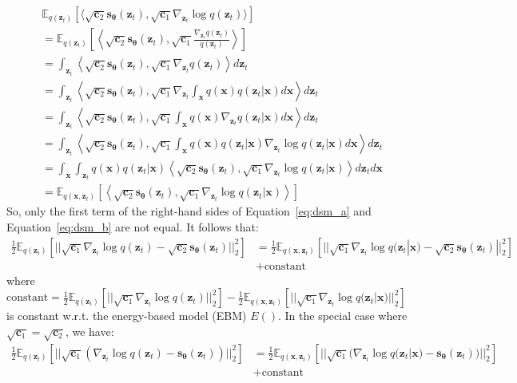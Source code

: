 \documentclass{article}
\def\Eqref#1{Equation~\ref{#1}}
\def\rvc{{\mathbf{c}}}
\def\rvx{{\mathbf{x}}}
\def\rvz{{\mathbf{z}}}
\newcommand{\E}{\mathbb{E}}
\newcommand{\bT}{{\boldsymbol{\theta}}}
\newcommand{\snT}{\mathbf{s}_{\bT}}
\begin{document}
\begin{align}
&\E_{q(\rvz_t)} \left[ \langle \sqrt{\rvc_2}\snT(\rvz_t), \sqrt{\rvc_1}\nabla_{\rvz_t} \log q(\rvz_t) \rangle \right]\\
&= 
\E_{q(\rvz_t)} \left[ \left\langle \sqrt{\rvc_2} \snT(\rvz_t), \sqrt{\rvc_1} \frac{\nabla_{\rvz_t} q(\rvz_t)}{q(\rvz_t)} \right\rangle \right]\\
&= \int_{\rvz_t} \left\langle \sqrt{\rvc_2}\snT(\rvz_t), \sqrt{\rvc_1}\nabla_{\rvz_t} q(\rvz_t) \right\rangle d\rvz_t\\
&= \int_{\rvz_t} \left\langle \sqrt{\rvc_2}\snT(\rvz_t), \sqrt{\rvc_1}\nabla_{\rvz_t} \int_{\rvx} q(\rvx) q(\rvz_t|\rvx) d\rvx \right\rangle d\rvz_t\\
&= \int_{\rvz_t} \left\langle \sqrt{\rvc_2}\snT(\rvz_t), \sqrt{\rvc_1}\int_{\rvx} q(\rvx) \nabla_{\rvz_t} q(\rvz_t|\rvx) d\rvx \right\rangle d\rvz_t\\
&= \int_{\rvz_t} \left\langle \sqrt{\rvc_2}\snT(\rvz_t), \sqrt{\rvc_1}\int_{\rvx} q(\rvx) q(\rvz_t|\rvx) \nabla_{\rvz_t} \log q(\rvz_t|\rvx) d\rvx \right\rangle d\rvz_t\\
&= \int_{\rvx} \int_{\rvz_t} q(\rvx) q(\rvz_t|\rvx) \left\langle \sqrt{\rvc_2}\snT(\rvz_t), \sqrt{\rvc_1} \nabla_{\rvz_t} \log q(\rvz_t|\rvx) \right\rangle d\rvz_t d\rvx\\
&= \E_{q(\rvx,\rvz_t)} \left[ \left\langle \sqrt{\rvc_2}\snT(\rvz_t),  \sqrt{\rvc_1}\nabla_{\rvz_t} \log q(\rvz_t|\rvx) \right\rangle \right]
\label{eq:dsm_c}
\end{align}
So, only the first term of the right-hand sides of \Eqref{eq:dsm_a} and \Eqref{eq:dsm_b} are not equal. It follows that:
\begin{align}
\tfrac{1}{2} \E_{q(\rvz_t)} \left[ ||\sqrt{\rvc_1}\nabla_{\rvz_t} \log q(\rvz_t) - \sqrt{\rvc_2}\snT(\rvz_t)||_2^2 \right] &= \tfrac{1}{2} \E_{q(\rvx,\rvz_t)} \left[ ||\sqrt{\rvc_1}\nabla_{\rvz_t} \log q(\rvz_t|\rvx) - \sqrt{\rvc_2}\snT(\rvz_t)||_2^2 \right]\nonumber\\
&+ \text{constant}
\label{eq:dsm}\end{align}
where $\text{constant} = \tfrac{1}{2} \E_{q(\rvz_t)} \left[ ||\sqrt{\rvc_1}\nabla_{\rvz_t} \log q(\rvz_t)||_2^2 \right] - \tfrac{1}{2} \E_{q(\rvx,\rvz_t)} \left[ ||\sqrt{\rvc_1}\nabla_{\rvz_t} \log q(\rvz_t|\rvx)||_2^2 \right]$ is constant w.r.t. the energy-based model (EBM) $E()$. In the special case where $\sqrt{\rvc_1}=\sqrt{\rvc_2}$, we have:
\begin{align}
\tfrac{1}{2} \E_{q(\rvz_t)} \left[ ||\sqrt{\rvc_1}(\nabla_{\rvz_t} \log q(\rvz_t) - \snT(\rvz_t))||_2^2 \right] &= \tfrac{1}{2} \E_{q(\rvx,\rvz_t)} \left[ ||\sqrt{\rvc_1}(\nabla_{\rvz_t} \log q(\rvz_t|\rvx) - \snT(\rvz_t))||_2^2 \right]\nonumber\\
&+ \text{constant}
\label{eq:dsm2}\end{align}
\end{document}
